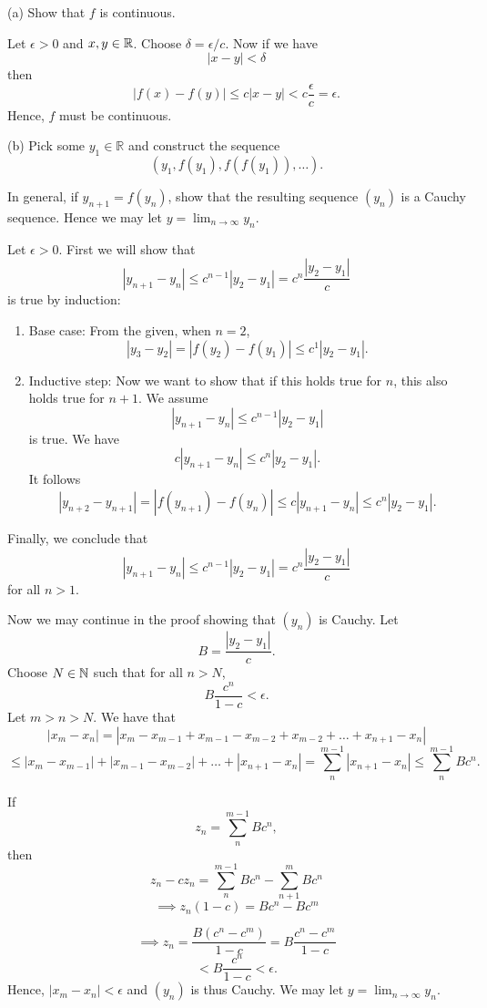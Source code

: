 \documentclass{report}
\begin{document}
(a) Show that $f$ is continuous.
\par
\bigskip
\begin{myproof}
    
Let $\epsilon > 0$ and $x,y \in \RR$. Choose $\delta= \epsilon/c$. Now if we have $$|x-y| < \delta$$ then $$|f(x) - f(y)| \leq c|x-y| < c \frac{\epsilon}{c} = \epsilon.$$
Hence, $f$ must be continuous.
\end{myproof}

\bigskip
\bigskip
(b) Pick some $y_1 \in \mathbb{R}$ and construct the sequence
$$
\left(y_1, f\left(y_1\right), f\left(f\left(y_1\right)\right), \ldots\right) .
$$

In general, if $y_{n+1}=f\left(y_n\right)$, show that the resulting sequence $\left(y_n\right)$ is a Cauchy sequence. Hence we may let $y=\lim _{n \rightarrow \infty} y_n$.

\bigskip
\begin{myproof}
  Let $\epsilon > 0.$ First we will show that $$|y_{n+1} - y_n| \leq c^{n-1}|y_2 - y_1|=c^{n}\frac{|y_2 - y_1|}{c}$$ is true by induction:
\bigskip
\par
\begin{enumerate}
  \item Base case: From the given, when $n=2$, $$|y_3 - y_2| =|f(y_2) - f(y_1)| \leq c^1|y_2 -y_1|.$$
  \item Inductive step: Now we want to show that if this holds true for $n$, this also holds true for $n+1$. We assume  $$ |y_{n+1} - y_n| \leq c^{n-1}|y_2 - y_1|$$ is true. We have $$ c|y_{n+1} - y_n| \leq c^{n}|y_2 - y_1|.$$ It follows
    $$|y_{n+2} - y_{n+1}| =|f(y_{n+1}) - f(y_{n})| \leq c|y_{n+1} - y_n| \leq c^{n}|y_2 - y_1|.$$
\end{enumerate}


Finally, we conclude that  $$|y_{n+1} - y_n| \leq c^{n-1}|y_2 - y_1|=c^{n}\frac{|y_2 - y_1|}{c}$$
for all $n > 1.$

\pagebreak
\bigskip
\par
Now we may continue in the proof showing that $(y_n)$ is Cauchy. Let $$B = \frac{|y_2 - y_1|}{c}.$$
Choose $N \in \NN$ such that for all $n>N$,$$B\frac{c^n}{1  - c}< \epsilon.$$ Let  $m > n > N.$  We have that  
  $$ |x_m - x_n|= |x_m - x_{m-1} + x_{m-1} - x_{m-2} + x_{m-2} + \dots + x_{n+1}- x_n| $$
$$\leq |x_m - x_{m-1}| + |x_{m-1} - x_{m-2}| +  \dots + |x_{n+1}- x_n| = \sum_{n}^{m-1}|x_{n+1} - x_n| \leq \sum_{n}^{m-1}Bc^{n}.$$

If $$z_n =\sum_{n}^{m-1}B c^{n},$$ then $$z_n  - cz_n = \sum_{n}^{m-1}B c^{n} - \sum_{n+1}^{m}Bc^{n}$$
$$\implies z_n(1  - c) = Bc^n - Bc^m $$

$$\implies z_n = \frac{B(c^n - c^m) }{1  - c}= B\frac{c^n - c^m }{1  - c} $$
$$< B\frac{c^n}{1  - c} < \epsilon.$$
Hence, $ |x_m - x_n| < \epsilon$ and $(y_n)$ is thus Cauchy. We may let $y=\lim _{n \rightarrow \infty} y_n.$

\end{myproof}
\end{document}
